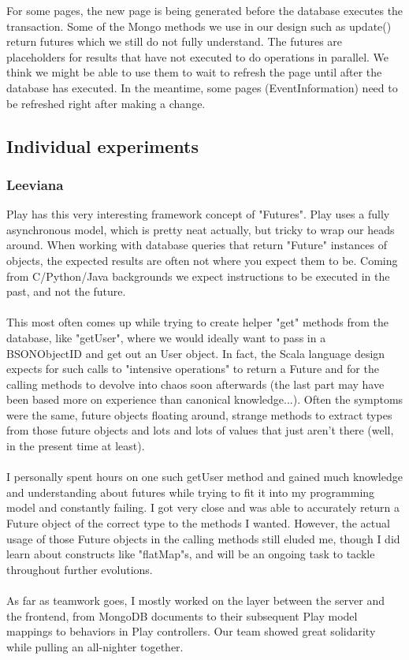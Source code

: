 \documentclass{article}
\begin{document}
    For some pages, the new page is being generated before the database executes the transaction.  Some of the Mongo methods we use in our design such as update() return futures which we still do not fully understand.  The futures are placeholders for results that have not executed to do operations in parallel.  We think we might be able to use them to wait to refresh the page until after the database has executed.  In the meantime, some pages (EventInformation) need to be refreshed right after making a change.

\subsection{Individual experiments}
\subsubsection{Leeviana}
Play has this very interesting framework concept of "Futures". Play uses a fully asynchronous model, which is pretty neat actually, but tricky to wrap our heads around. When working with database queries that return "Future" instances of objects, the expected results are often not where you expect them to be. Coming from C/Python/Java backgrounds we expect instructions to be executed in the past, and not the future.
\\\\
This most often comes up while trying to create helper "get" methods from the database, like "getUser", where we would ideally want to pass in a BSONObjectID and get out an User object. In fact, the Scala language design expects for such calls to "intensive operations" to return a Future and for the calling methods to devolve into chaos soon afterwards (the last part may have been based more on experience than canonical knowledge...). Often the symptoms were the same, future objects floating around, strange methods to extract types from those future objects and lots and lots of values that just aren't there (well, in the present time at least).
\\\\
I personally spent hours on one such getUser method and gained much knowledge and understanding about futures while trying to fit it into my programming model and constantly failing. I got very close and was able to accurately return a Future object of the correct type to the methods I wanted. However, the actual usage of those Future objects in the calling methods still eluded me, though I did learn about constructs like "flatMap"s, and will be an ongoing task to tackle throughout further evolutions.
\\\\
As far as teamwork goes, I mostly worked on the layer between the server and the frontend, from MongoDB documents to their subsequent Play model mappings to behaviors in Play controllers. Our team showed great solidarity while pulling an all-nighter together.
\end{document}
